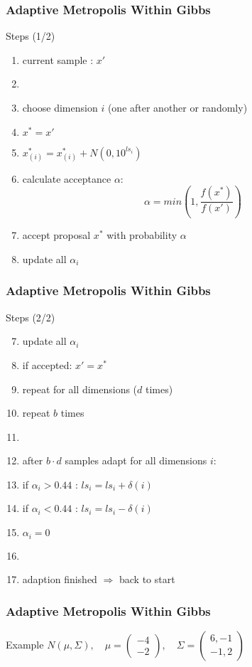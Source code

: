 \begin{frame}
\frametitle{Adaptive Metropolis Within Gibbs}

\begin{block}{Steps (1/2)}
\begin{enumerate}
  \item current sample : $x'$
  \item[]
\item choose dimension $i$ (one after another or randomly)
\item $x^* = x'$
\item $x^*_{(i)} = x^*_{(i)} + N(0, 10^{ls_i})$
\item calculate acceptance $\alpha$:
\[\alpha = min\left(1, \frac{f(x^*)}{f(x')} \right)\]

\item accept proposal $x^*$ with probability $\alpha$
\item update all $\alpha_i$
\end{enumerate}
\end{block}
\end{frame}

\begin{frame}
\frametitle{Adaptive Metropolis Within Gibbs}
\begin{block}{Steps (2/2)}
\begin{enumerate}
\setcounter{enumi}{6}
\item update all $\alpha_i$
\item if accepted: $x' = x^*$
\item repeat for all dimensions ($d$ times)
\item repeat $b$ times
\item[]
\item after $b\cdot d$ samples adapt for all dimensions $i$:
\item if $\alpha_i > 0.44$ : $ls_i = ls_i + \delta(i)$
\item if $\alpha_i < 0.44$ : $ls_i = ls_i - \delta(i)$
\item $\alpha_i = 0$
\item []
\item adaption finished $\Rightarrow$ back to start
\end{enumerate}
\end{block}
\end{frame}

\begin{frame}
\frametitle{Adaptive Metropolis Within Gibbs}
\begin{block}{Example}
$N(\mu, \Sigma), \quad \mu = \begin{pmatrix} -4 \\ -2
\end{pmatrix} , \quad \Sigma = \begin{pmatrix} 6,-1 \\ -1,2
\end{pmatrix}$
\end{block}
\end{frame}